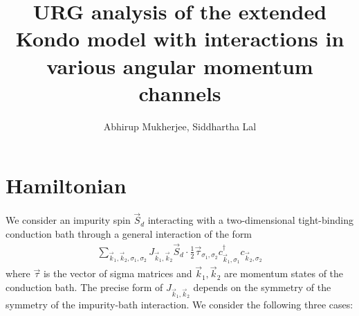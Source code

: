 \documentclass{revtex4-2}
\begin{document}
\title{URG analysis of the extended Kondo model with interactions in various angular momentum channels}
\author{Abhirup Mukherjee, Siddhartha Lal}
\maketitle
\section{Hamiltonian}
We consider an impurity spin \(\vec S_d\) interacting with a two-dimensional tight-binding conduction bath through a general interaction of the form
\begin{equation}\begin{aligned}
		\sum_{\vec k_1, \vec k_2, \sigma_1, \sigma_2} J_{\vec k_1, \vec k_2} \vec{S}_d\cdot\frac{1}{2}\vec{\tau}_{\sigma_1,\sigma_2} c^\dagger_{\vec k_1,\sigma_1}c_{\vec k_2,\sigma_2}
\end{aligned}\end{equation}
where \(\vec \tau\) is the vector of sigma matrices and \(\vec k_1,\vec k_2\) are momentum states of the conduction bath. The precise form of \(J_{\vec k_1, \vec k_2}\) depends on the symmetry of the symmetry of the impurity-bath interaction. We consider the following three cases:
\end{document}
